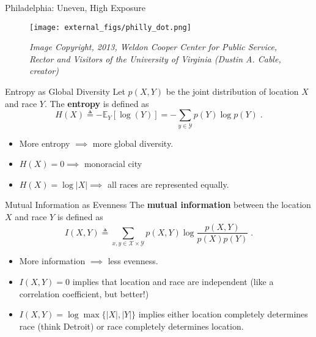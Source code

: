 \documentclass{beamer}
\begin{document}
  		\begin{frame}{Philadelphia: Uneven, High Exposure}
	  		\begin{figure}
	  			\texttt{[image: external\_figs/philly\_dot.png]}
	  			\caption{\textit{Image Copyright, 2013, Weldon Cooper Center for Public Service, Rector and Visitors of the University of Virginia (Dustin A. Cable, creator)}}
	  		\end{figure}
  		\end{frame}

  		\begin{frame}{Entropy as Global Diversity}
  			Let $p(X,Y)$ be the joint distribution of location $X$ and race $Y$. The \textbf{entropy} is defined as 
  			\begin{equation}
  				H(X) \triangleq - \mathbb{E}_Y[\log(Y)] = -\sum_{y \in \mathcal{Y}} p(Y)\log p(Y)\;.
  			\end{equation}
  			\begin{itemize}
  				\item More entropy $\implies$ more global diversity.
  				\item $H(X) = 0 \implies$ monoracial city
  				\item $H(X) = \log \left|X\right| \implies$ all races are represented equally.    
  			\end{itemize} 
  		\end{frame}

  		\begin{frame}{Mutual Information as Evenness}
  			The \textbf{mutual information} between the location $X$ and race $Y$ is defined as 	
  			\begin{equation}
  				I(X,Y) \triangleq \sum_{x,y \in \mathcal{X} \times \mathcal{Y}}p(X,Y) \log \frac{p(X,Y)}{p(X)p(Y)}\;.
  			\end{equation}
  			\begin{itemize}
  				\item More information $\implies$ less evenness. 
  				\item $I(X,Y) = 0$ implies that location and race are independent (like a correlation coefficient, but better!)
  				\item $I(X,Y) = \log \max\{\left|X\right|,\left|Y\right|\}$ implies either location completely determines race (think Detroit) or race completely determines location. 
  			\end{itemize}
  			
  		\end{frame}

  		
\end{document}
